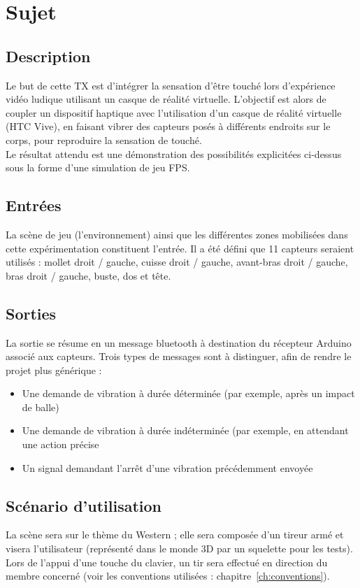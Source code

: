 \chapter{Sujet} 
\label{ch:sujet}

\section{Description}

Le but de cette TX est d'intégrer la sensation d’être touché lors d’expérience vidéo ludique utilisant un casque de réalité virtuelle. L'objectif est alors de coupler un dispositif haptique avec l'utilisation d'un casque de réalité virtuelle (HTC Vive), en faisant vibrer des capteurs posés à différents endroits sur le corps, pour reproduire la sensation de touché. \\
Le résultat attendu est une démonstration des possibilités explicitées ci-dessus sous la forme d'une simulation de jeu FPS.

\section{Entrées}

La scène de jeu (l'environnement) ainsi que les différentes zones mobilisées dans cette expérimentation constituent l'entrée. Il a été défini que 11 capteurs seraient utilisés : mollet droit / gauche, cuisse droit / gauche, avant-bras droit / gauche, bras droit / gauche, buste, dos et tête.

\section{Sorties}

La sortie se résume en un message bluetooth à destination du récepteur Arduino associé aux capteurs. Trois types de messages sont à distinguer, afin de rendre le projet plus générique : 
\begin{itemize}
	\item Une demande de vibration à durée déterminée (par exemple, après un impact de balle)
	\item Une demande de vibration à durée indéterminée (par exemple, en attendant une action précise
	\item Un signal demandant l'arrêt d'une vibration précédemment envoyée
\end{itemize}

\section{Scénario d'utilisation}

La scène sera sur le thème du Western ; elle sera composée d'un tireur armé et visera l'utilisateur (représenté dans le monde 3D par un squelette pour les tests). Lors de l'appui d'une touche du clavier, un tir sera effectué en direction du membre concerné (voir les conventions utilisées : chapitre~\ref{ch:conventions}).

